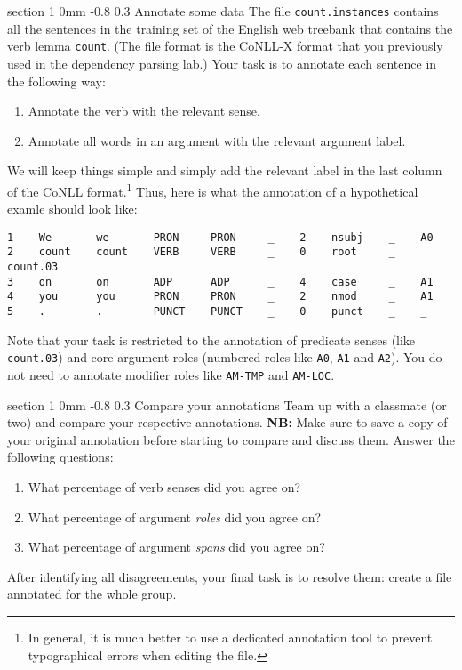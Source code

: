 \documentclass[11pt]{article}
\makeatletter
\newcommand{\newsec}[2]{\section{#1}\label{sec:#2}\noindent}
\renewcommand{\section}{\@startsection
{section}%
{1}%
{0mm}%
{-0.8\baselineskip}%
{0.3\baselineskip}%
{\bfseries\large}}%
\makeatother
\begin{document}
\newsec{Annotate some data }{annotate}%
The file {\tt count.instances} contains all the sentences in the
training set of the English web treebank that contains the verb lemma
{\tt count}. (The file format is the CoNLL-X format that you
previously used in the dependency parsing lab.) Your task is to
annotate each sentence in the following way:
\begin{enumerate}[noitemsep,topsep=0.2cm]
\item  Annotate the verb with the relevant sense.
\item  Annotate all words in an argument with the relevant argument label.
\end{enumerate}
We will keep things simple and simply add the relevant label in the
last column of the CoNLL format.\footnote{In general, it is much
  better to use a dedicated annotation tool to prevent typographical
  errors when editing the file.}  Thus, here is what the annotation of
a hypothetical examle should look like:
\begin{Verbatim}[fontsize=\small,xleftmargin=\parindent]
1    We       we       PRON     PRON     _    2    nsubj    _    A0
2    count    count    VERB     VERB     _    0    root     _    count.03
3    on       on       ADP      ADP      _    4    case     _    A1
4    you      you      PRON     PRON     _    2    nmod     _    A1
5    .        .        PUNCT    PUNCT    _    0    punct    _    _
\end{Verbatim}
Note that your task is restricted to the annotation of predicate
senses (like {\tt count.03}) and core argument roles (numbered roles
like {\tt A0}, {\tt A1} and {\tt A2}). You do not need to annotate
modifier roles like {\tt AM-TMP} and {\tt AM-LOC}.

\newsec{Compare your annotations }{compare}%
Team up with a classmate (or two) and compare your respective
annotations. {\bf NB:} Make sure to save a copy of your original
annotation before starting to compare and discuss them.  Answer the
following questions:
\begin{enumerate}[noitemsep,topsep=0.2cm]
\item  What percentage of verb senses did you agree on? 
\item  What percentage of argument {\em roles} did you agree on?
\item  What percentage of argument {\em spans} did you agree on?
\end{enumerate}
After identifying all disagreements, your final task is to resolve
them: create a file annotated for the whole group.
\end{document}
